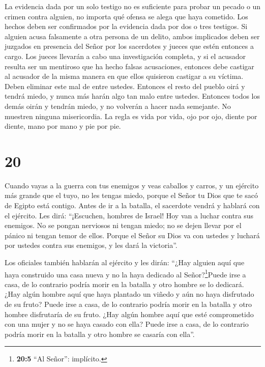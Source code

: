  La evidencia dada por un solo testigo no es suficiente
para probar un pecado o un crimen contra alguien, no importa qué ofensa
se alega que haya cometido. Los hechos deben ser confirmados por la
evidencia dada por dos o tres testigos.  Si alguien acusa
falsamente a otra persona de un delito,  ambos implicados
deben ser juzgados en presencia del Señor por los sacerdotes y jueces
que estén entonces a cargo.  Los jueces llevarán a cabo una
investigación completa, y si el acusador resulta ser un mentiroso que ha
hecho falsas acusaciones,  entonces debe castigar al
acusador de la misma manera en que ellos quisieron castigar a su
víctima. Deben eliminar este mal de entre ustedes. 
Entonces el resto del pueblo oirá y tendrá miedo, y nunca más harán algo
tan malo entre ustedes. Entonces todos los demás oirán y tendrán miedo,
y no volverán a hacer nada semejante.  No muestren ninguna
misericordia. La regla es vida por vida, ojo por ojo, diente por diente,
mano por mano y pie por pie.

\hypertarget{section-19}{%
\section{20}\label{section-19}}

 Cuando vayas a la guerra con tus enemigos y veas caballos y
carros, y un ejército más grande que el tuyo, no les tengas miedo,
porque el Señor tu Dios que te sacó de Egipto está contigo. 
Antes de ir a la batalla, el sacerdote vendrá y hablará con el ejército.
 Les dirá: ``¡Escuchen, hombres de Israel! Hoy van a luchar
contra sus enemigos. No se pongan nerviosos ni tengan miedo; no se dejen
llevar por el pánico ni tengan temor de ellos.  Porque el
Señor su Dios va con ustedes y luchará por ustedes contra sus enemigos,
y les dará la victoria''.

 Los oficiales también hablarán al ejército y les dirán:
``¿Hay alguien aquí que haya construido una casa nueva y no la haya
dedicado al Señor?\footnote{\textbf{20:5} ``Al Señor'': implícito.}Puede
irse a casa, de lo contrario podría morir en la batalla y otro hombre se
lo dedicará.  ¿Hay algún hombre aquí que haya plantado un
viñedo y aún no haya disfrutado de su fruto? Puede irse a casa, de lo
contrario podría morir en la batalla y otro hombre disfrutaría de su
fruto.  ¿Hay algún hombre aquí que esté comprometido con una
mujer y no se haya casado con ella? Puede irse a casa, de lo contrario
podría morir en la batalla y otro hombre se casaría con ella''.


